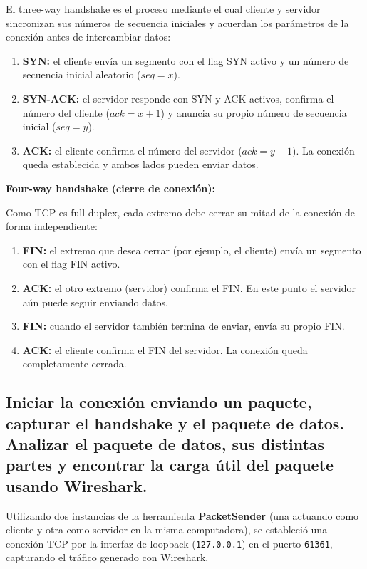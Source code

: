\documentclass[12pt,a4paper]{article}
\begin{document}
El three-way handshake es el proceso mediante el cual cliente y servidor sincronizan sus números de secuencia iniciales y acuerdan los parámetros de la conexión antes de intercambiar datos:

\begin{enumerate}
  \item \textbf{SYN:} el cliente envía un segmento con el flag SYN activo y un número de secuencia inicial aleatorio ($seq = x$).
  \item \textbf{SYN-ACK:} el servidor responde con SYN y ACK activos, confirma el número del cliente ($ack = x+1$) y anuncia su propio número de secuencia inicial ($seq = y$).
  \item \textbf{ACK:} el cliente confirma el número del servidor ($ack = y+1$). La conexión queda establecida y ambos lados pueden enviar datos.
\end{enumerate}

\textbf{Four-way handshake (cierre de conexión):}

Como TCP es full-duplex, cada extremo debe cerrar su mitad de la conexión de forma independiente:

\begin{enumerate}
  \item \textbf{FIN:} el extremo que desea cerrar (por ejemplo, el cliente) envía un segmento con el flag FIN activo.
  \item \textbf{ACK:} el otro extremo (servidor) confirma el FIN. En este punto el servidor aún puede seguir enviando datos.
  \item \textbf{FIN:} cuando el servidor también termina de enviar, envía su propio FIN.
  \item \textbf{ACK:} el cliente confirma el FIN del servidor. La conexión queda completamente cerrada.
\end{enumerate}

\subsection{Iniciar la conexión enviando un paquete, capturar el handshake y el paquete de datos. Analizar el paquete de datos, sus distintas partes y encontrar la carga útil del paquete usando Wireshark.}

Utilizando dos instancias de la herramienta \textbf{PacketSender} (una actuando como cliente y otra como servidor en la misma computadora), se estableció una conexión TCP por la interfaz de loopback (\texttt{127.0.0.1}) en el puerto \texttt{61361}, capturando el tráfico generado con Wireshark. 
\end{document}
